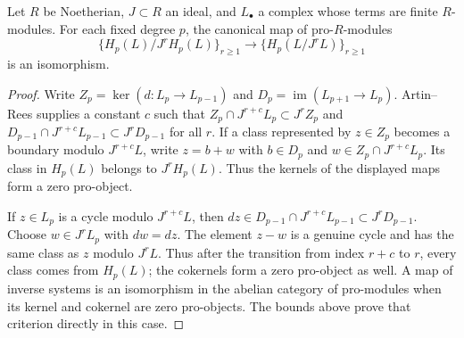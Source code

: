 \begin{lemma}\label{SA23-B1-2}
Let $R$ be Noetherian, $J\subset R$ an ideal, and $L_\bullet$ a
complex whose terms are finite $R$-modules.  For each fixed degree
$p$, the canonical map of pro-$R$-modules
\[
 \{H_p(L)/J^rH_p(L)\}_{r\ge1}
 \longrightarrow \{H_p(L/J^rL)\}_{r\ge1}
\]
is an isomorphism.
\end{lemma}
\begin{proof}
Write $Z_p=\ker(d:L_p\to L_{p-1})$ and
$D_p=\operatorname{im}(L_{p+1}\to L_p)$.  Artin--Rees
\cite[Lemma 10.51.2]{algStacksArtinRees} supplies a
constant $c$ such that
$Z_p\cap J^{r+c}L_p\subset J^rZ_p$ and
$D_{p-1}\cap J^{r+c}L_{p-1}\subset J^rD_{p-1}$ for all $r$.
If a class represented by $z\in Z_p$ becomes a boundary modulo
$J^{r+c}L$, write $z=b+w$ with $b\in D_p$ and
$w\in Z_p\cap J^{r+c}L_p$.  Its class in $H_p(L)$ belongs to
$J^rH_p(L)$.  Thus the kernels of the displayed maps form a zero
pro-object.

If $z\in L_p$ is a cycle modulo $J^{r+c}L$, then
$dz\in D_{p-1}\cap J^{r+c}L_{p-1}\subset J^rD_{p-1}$.
Choose $w\in J^rL_p$ with $dw=dz$.  The element $z-w$ is a genuine
cycle and has the same class as $z$ modulo $J^rL$.  Thus after the
transition from index $r+c$ to $r$, every class comes from $H_p(L)$;
the cokernels form a zero pro-object as well.  A map of inverse
systems is an isomorphism in the abelian category of pro-modules
when its kernel and cokernel are zero pro-objects.  The bounds above
prove that criterion directly in this case.
\end{proof}

